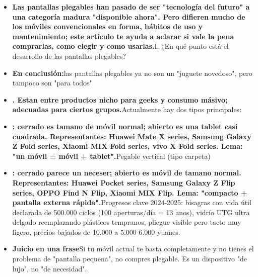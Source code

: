 

\begin{itemize}
  \item \textbf{Las pantallas plegables han pasado de ser "tecnología del futuro" a una categoría madura "disponible ahora". Pero difieren mucho de los móviles convencionales en forma, hábitos de uso y mantenimiento; este artículo te ayuda a aclarar si vale la pena comprarlas, como elegir y como usarlas.}I. ¿En qué punto está el desarrollo de las pantallas plegables?
  \item \textbf{En conclusión:}las pantallas plegables ya no son un "juguete novedoso", pero tampoco son "para todos"
  \item \textbf{. Estan entre productos nicho para geeks y consumo másivo; adecuadas para ciertos grupos.}Actualmente hay dos tipos principales:
\end{itemize}


\begin{itemize}
  \item \textbf{: cerrado es tamano de móvil normal; abierto es una tablet casi cuadrada. Representantes: Huawei Mate X series, Samsung Galaxy Z Fold series, Xiaomi MIX Fold series, vivo X Fold series. Lema: "un móvil = móvil + tablet".}Pegable vertical (tipo carpeta)
  \item \textbf{: cerrado parece un neceser; abierto es móvil de tamano normal. Representantes: Huawei Pocket series, Samsung Galaxy Z Flip series, OPPO Find N Flip, Xiaomi MIX Flip. Lema: "compacto + pantalla externa rápida".}Progresos clave 2024-2025: bisagras con vida útil declarada de 500.000 ciclos (100 aperturas/día = 13 anos), vidrío UTG ultra delgado reemplazando plásticos tempranos, pliegue visible pero tacto muy ligero, precios bajados de 10.000 a 5.000-6.000 yuanes.
  \item \textbf{Juicio en una frase}Si tu móvil actual te basta completamente y no tienes el problema de "pantalla pequena", no compres plegable. Es un dispositivo "de lujo", no "de necesidad".
\end{itemize}


